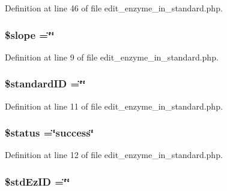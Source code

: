 Definition at line 46 of file edit\-\_\-enzyme\-\_\-in\-\_\-standard.\-php.

\hypertarget{edit__enzyme__in__standard_8php_aa6841113bca2f461aae7a334e615c44f}{
\subsubsection[{\$slope}]{\setlength{\rightskip}{0pt plus 5cm}\$slope =\char`\"{}\char`\"{}}}\label{edit__enzyme__in__standard_8php_aa6841113bca2f461aae7a334e615c44f}


Definition at line 9 of file edit\-\_\-enzyme\-\_\-in\-\_\-standard.\-php.

\hypertarget{edit__enzyme__in__standard_8php_a0c541a369e4a0434108a7d145751bb23}{
\subsubsection[{\$standard\-I\-D}]{\setlength{\rightskip}{0pt plus 5cm}\$standard\-I\-D =\char`\"{}\char`\"{}}}\label{edit__enzyme__in__standard_8php_a0c541a369e4a0434108a7d145751bb23}


Definition at line 11 of file edit\-\_\-enzyme\-\_\-in\-\_\-standard.\-php.

\hypertarget{edit__enzyme__in__standard_8php_a58391ea75f2d29d5d708d7050b641c33}{
\subsubsection[{\$status}]{\setlength{\rightskip}{0pt plus 5cm}\$status =\char`\"{}success\char`\"{}}}\label{edit__enzyme__in__standard_8php_a58391ea75f2d29d5d708d7050b641c33}


Definition at line 12 of file edit\-\_\-enzyme\-\_\-in\-\_\-standard.\-php.

\hypertarget{edit__enzyme__in__standard_8php_a1a82343ffd9662108bf3501398fcd3fb}{
\subsubsection[{\$std\-Ez\-I\-D}]{\setlength{\rightskip}{0pt plus 5cm}\$std\-Ez\-I\-D =\char`\"{}\char`\"{}}}\label{edit__enzyme__in__standard_8php_a1a82343ffd9662108bf3501398fcd3fb}



